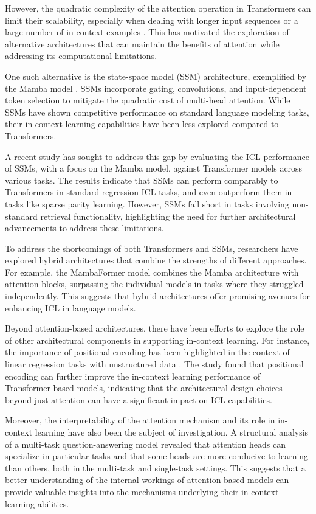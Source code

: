 \documentclass[11pt]{article}
\begin{document}
However, the quadratic complexity of the attention operation in Transformers can limit their scalability, especially when dealing with longer input sequences or a large number of in-context examples \cite{ref100}. This has motivated the exploration of alternative architectures that can maintain the benefits of attention while addressing its computational limitations.

One such alternative is the state-space model (SSM) architecture, exemplified by the Mamba model \cite{ref101}. SSMs incorporate gating, convolutions, and input-dependent token selection to mitigate the quadratic cost of multi-head attention. While SSMs have shown competitive performance on standard language modeling tasks, their in-context learning capabilities have been less explored compared to Transformers.

A recent study \cite{ref101} has sought to address this gap by evaluating the ICL performance of SSMs, with a focus on the Mamba model, against Transformer models across various tasks. The results indicate that SSMs can perform comparably to Transformers in standard regression ICL tasks, and even outperform them in tasks like sparse parity learning. However, SSMs fall short in tasks involving non-standard retrieval functionality, highlighting the need for further architectural advancements to address these limitations.

To address the shortcomings of both Transformers and SSMs, researchers have explored hybrid architectures that combine the strengths of different approaches. For example, the MambaFormer model \cite{ref101} combines the Mamba architecture with attention blocks, surpassing the individual models in tasks where they struggled independently. This suggests that hybrid architectures offer promising avenues for enhancing ICL in language models.

Beyond attention-based architectures, there have been efforts to explore the role of other architectural components in supporting in-context learning. For instance, the importance of positional encoding has been highlighted in the context of linear regression tasks with unstructured data \cite{ref102}. The study found that positional encoding can further improve the in-context learning performance of Transformer-based models, indicating that the architectural design choices beyond just attention can have a significant impact on ICL capabilities.

Moreover, the interpretability of the attention mechanism and its role in in-context learning have also been the subject of investigation. A structural analysis of a multi-task question-answering model \cite{ref103} revealed that attention heads can specialize in particular tasks and that some heads are more conducive to learning than others, both in the multi-task and single-task settings. This suggests that a better understanding of the internal workings of attention-based models can provide valuable insights into the mechanisms underlying their in-context learning abilities.
\end{document}
